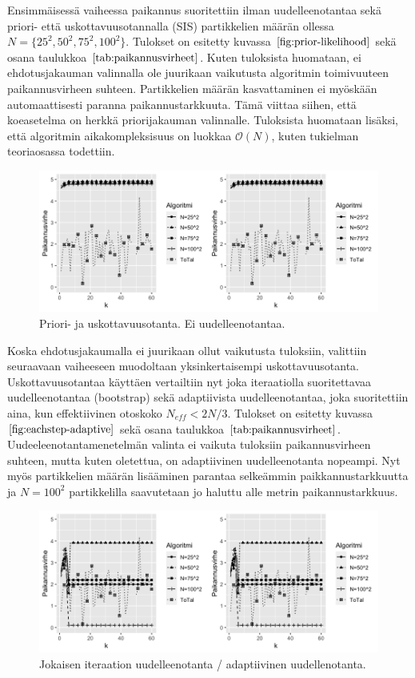 \documentclass[
  12pt,
  a4paper, twoside]{book}
\begin{document}
Ensimmäisessä vaiheessa paikannus suoritettiin ilman uudelleenotantaa sekä priori- että uskottavuusotannalla (SIS) partikkelien määrän ollessa \(N=\{25^2,50^2,75^2,100^2\}\). Tulokset on esitetty kuvassa \(\ref{fig:prior-likelihood}\) sekä osana taulukkoa \(\ref{tab:paikannusvirheet}\). Kuten tuloksista huomataan, ei ehdotusjakauman valinnalla ole juurikaan vaikutusta algoritmin toimivuuteen paikannusvirheen suhteen. Partikkelien määrän kasvattaminen ei myöskään automaattisesti paranna paikannustarkkuuta. Tämä viittaa siihen, että koeasetelma on herkkä priorijakauman valinnalle. Tuloksista huomataan lisäksi, että algoritmin aikakompleksisuus on luokkaa \(\mathcal{O}(N)\), kuten tukielman teoriaosassa todettiin.

\begin{figure}[H]
\centering
\includegraphics[width=15cm]{prior_likelihood}
\caption{Priori- ja uskottavuusotanta. Ei uudelleenotantaa.}
\label{fig:prior-likelihood}
\end{figure}

Koska ehdotusjakaumalla ei juurikaan ollut vaikutusta tuloksiin, valittiin seuraavaan vaiheeseen muodoltaan yksinkertaisempi uskottavuusotanta. Uskottavuusotantaa käyttäen vertailtiin nyt joka iteraatiolla suoritettavaa uudelleenotantaa (bootstrap) sekä adaptiivista uudelleenotantaa, joka suoritettiin aina, kun effektiivinen otoskoko \(N_{eff}<2N/3\). Tulokset on esitetty kuvassa \(\ref{fig:eachstep-adaptive}\) sekä osana taulukkoa \(\ref{tab:paikannusvirheet}\). Uudeeleenotantamenetelmän valinta ei vaikuta tuloksiin paikannusvirheen suhteen, mutta kuten oletettua, on adaptiivinen uudelleenotanta nopeampi. Nyt myös partikkelien määrän lisääminen parantaa selkeämmin paikkannustarkkuutta ja \(N=100^2\) partikkelilla saavutetaan jo haluttu alle metrin paikannustarkkuus.

\begin{figure}[H]
\centering
\includegraphics[width=14.5cm]{eachstep_adaptive}
\caption{Jokaisen iteraation uudelleenotanta / adaptiivinen uudellenotanta.}
\label{fig:eachstep-adaptive}
\end{figure}
\end{document}
